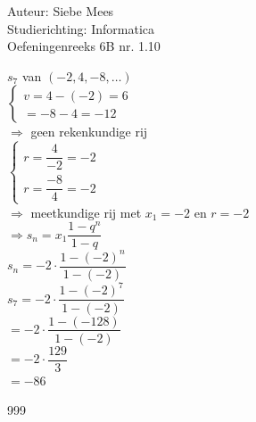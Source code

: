 \documentclass[a4paper]{article}
\begin{document}
  
\noindent \large Auteur: Siebe Mees \\
\noindent \large Studierichting: Informatica\\
\noindent \large Oefeningenreeks 6B nr. 1.10\\

\medskip

\normalsize

$s_7 $ van $ (-2,4,-8,\ldots)$\\

$\left \{
\begin{array}{l}
v = 4 - (-2) = 6 \\
= -8 - 4 = -12
\end{array}
\right .$\\

$\Rightarrow $ geen rekenkundige rij\\

$\left \{
\begin{array}{l}
r = \dfrac{4}{-2} = -2 \\

r = \dfrac{-8}{4} = -2
\end{array}
\right .$\\

$\Rightarrow $ meetkundige rij met $ x_1=-2 $ en $ r=-2$\\

$\Rightarrow s_n = x_1 \dfrac{1-q^n}{1-q}$\\

$s_n = -2 \cdot \dfrac{1-(-2)^n}{1-(-2)}$\\

$s_7 = -2 \cdot \dfrac{1-(-2)^7}{1-(-2)}$\\

$= -2 \cdot \dfrac{1-(-128)}{1-(-2)}$\\

$= -2 \cdot \dfrac{129}{3}$\\

$= -86$\\

\begin{thebibliography}{999}
\end{thebibliography}
\end{document}
